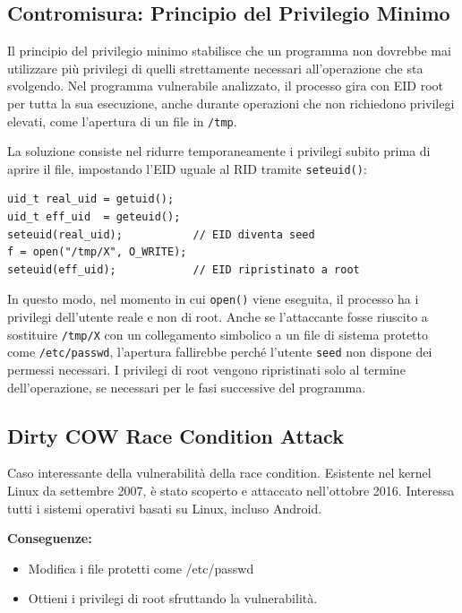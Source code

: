 \documentclass{article}
\begin{document}
\subsection*{Contromisura: Principio del Privilegio Minimo}

Il principio del privilegio minimo stabilisce che un programma non 
dovrebbe mai utilizzare più privilegi di quelli strettamente necessari 
all'operazione che sta svolgendo. Nel programma vulnerabile analizzato, 
il processo gira con EID root per tutta la sua esecuzione, anche durante 
operazioni che non richiedono privilegi elevati, come l'apertura di un 
file in \texttt{/tmp}.

La soluzione consiste nel ridurre temporaneamente i privilegi subito 
prima di aprire il file, impostando l'EID uguale al RID tramite 
\texttt{seteuid()}:

\begin{verbatim}
uid_t real_uid = getuid();
uid_t eff_uid  = geteuid();
seteuid(real_uid);           // EID diventa seed
f = open("/tmp/X", O_WRITE);
seteuid(eff_uid);            // EID ripristinato a root
\end{verbatim}

In questo modo, nel momento in cui \texttt{open()} viene eseguita, il 
processo ha i privilegi dell'utente reale e non di root. Anche se 
l'attaccante fosse riuscito a sostituire \texttt{/tmp/X} con un 
collegamento simbolico a un file di sistema protetto come 
\texttt{/etc/passwd}, l'apertura fallirebbe perché l'utente 
\texttt{seed} non dispone dei permessi necessari. I privilegi di root 
vengono ripristinati solo al termine dell'operazione, se necessari per 
le fasi successive del programma.

\subsection*{Dirty COW Race Condition Attack}
Caso interessante della vulnerabilità della race condition. Esistente nel kernel Linux da settembre 2007, è stato scoperto 
e attaccato nell'ottobre 2016. Interessa tutti i sistemi operativi basati su Linux, incluso Android.

\textbf{Conseguenze:} 
\begin{itemize}
    \item Modifica i file protetti come /etc/passwd
    \item Ottieni i privilegi di root sfruttando la vulnerabilità.
\end{itemize}
\end{document}
